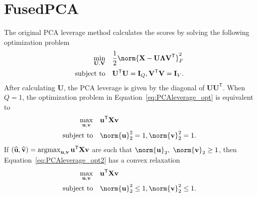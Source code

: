 \documentclass{article}
\renewcommand{\hat}{\widehat}
\newcommand{\X}{\bfX}
\DeclareMathOperator{\argmax}{argmax}
\renewcommand{\top}{\mathsf{T}}
\begin{document}

\newpage
\section{FusedPCA}
\label{app:PCATF}

The original PCA leverage method \citep{mejiaPCALeverageOutlier2017} calculates the scores by solving the
following optimization problem
\begin{align}
\label{eq:PCAleverage_opt}
\begin{split} \min_{\mathbf{U},\mathbf{V}} & \quad \frac{1}{2}
\norm{\X - \mathbf{U}\mathbf{\Lambda}\mathbf{V}^\top}^2_F \\ \text{subject to} &
\quad \mathbf{U}^\top \mathbf{U} = \mathbf{I}_Q, \mathbf{V}^\top \mathbf{V} =
\mathbf{I}_V.
\end{split}
\end{align}
After calculating $\mathbf{U}$, the PCA leverage is given by the diagonal of
$\mathbf{U} \mathbf{U}^\top$. 
When $Q = 1$, the optimization problem in Equation~\eqref{eq:PCAleverage_opt} is equivalent to
\begin{align}
\label{eq:PCAleverage_opt2}
\begin{split} \max_{\mathbf{u}, \mathbf{v}} & \quad \mathbf{u}^\top \X
\mathbf{v} \\ \text{subject to} & \quad \norm{\mathbf{u}}^2_2 = 1,
\norm{\mathbf{v}}^2_2 = 1.
\end{split}
\end{align} 
If  $(\hat{\mathbf{u}},\hat\bfv) = \argmax_{\mathbf{u},\bfv} \mathbf{u}^\top \X\bfv$  are such that $\norm{\mathbf{u}}_2,\ \norm{\bfv}_2 \geq 1$, then Equation~\eqref{eq:PCAleverage_opt2} has a convex relaxation
\begin{align}
\label{eq:PCAleverage_opt3}
\begin{split} \max_{\mathbf{u}, \mathbf{v}} & \quad \mathbf{u}^\top \X
\mathbf{v} \\ \text{subject to} & \quad \norm{\mathbf{u}}^2_2 \le 1,
\norm{\mathbf{v}}^2_2 \le 1.
\end{split}
\end{align}
\end{document}
